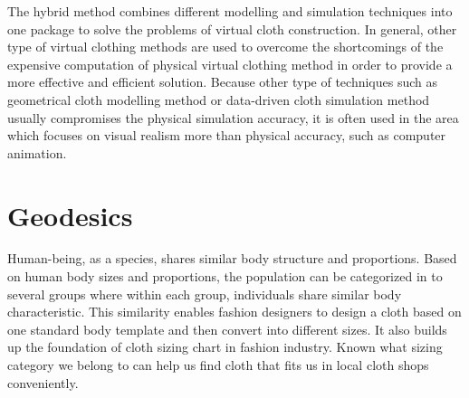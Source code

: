 %
%








The hybrid method combines different modelling and simulation techniques into one package to solve the problems of virtual cloth construction. In general, other type of virtual clothing methods are used to overcome the shortcomings of the expensive computation of physical virtual clothing method in order to provide a more effective and efficient solution. Because other type of techniques such as geometrical cloth modelling method or data-driven cloth simulation method usually compromises the physical simulation accuracy, it is often used in the area which focuses on visual realism more than physical accuracy, such as computer animation.    

\section{Geodesics}
Human-being, as a species, shares similar body structure and proportions. Based on human body sizes and proportions, the population can be categorized in to several groups where within each group, individuals share similar body characteristic. This similarity enables fashion designers to design a cloth based on one standard body template and then convert into different sizes. It also builds up the foundation of cloth sizing chart in fashion industry. Known what sizing category we belong to can help us find cloth that fits us in local cloth shops conveniently. 

